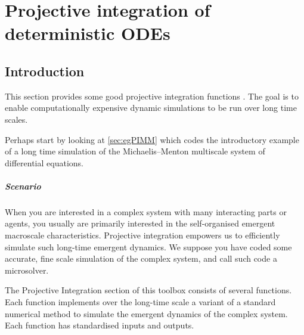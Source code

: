 \chapter{Projective integration of deterministic ODEs}
\label{sec:ProjInt}
\localtableofcontents


\section{Introduction}

This section provides some good projective integration functions \cite[e.g.]{Gear02b, Gear03c, Givon06, Sieber2018}.
The goal is to enable computationally expensive dynamic simulations to be run over long time scales.
\begin{userMan} 
Perhaps start by looking at \cref{sec:egPIMM} which codes the introductory example of a long time simulation of the Michaelis--Menton multiscale system of differential equations.
\end{userMan}

\paragraph{Scenario}
When you are interested in a complex system with many interacting parts or agents, you usually are primarily interested in the self-organised emergent macroscale characteristics.
Projective integration empowers us to efficiently simulate such long-time emergent dynamics.
We suppose you have coded some accurate, fine scale simulation of the complex system, and call such code a microsolver.

The Projective Integration section of this toolbox consists of several functions.
Each function implements over the long-time scale a variant of a standard numerical method to simulate the emergent dynamics of the complex system.
Each function has standardised inputs and outputs.


